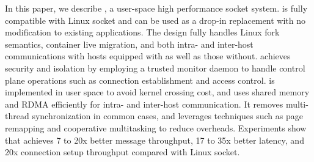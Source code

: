 In this paper, we describe \sys, a user-space high performance socket system. \sys is fully compatible with Linux socket and can be used as a drop-in replacement with no modification to existing applications. The design fully handles Linux fork semantics, container live migration, and both intra- and inter-host communications with hosts equipped with \sys as well as those without. \sys achieves security and isolation by employing a trusted monitor daemon to handle control plane operations such as connection establishment and access control. \sys is implemented in user space to avoid kernel crossing cost, and uses shared memory and RDMA efficiently for intra- and inter-host communication. It removes multi-thread synchronization in common cases, and leverages techniques such as page remapping and cooperative multitasking to reduce overheads. Experiments show that \sys achieves 7 to 20x better message throughput, 17 to 35x better latency, and 20x connection setup throughput compared with Linux socket.